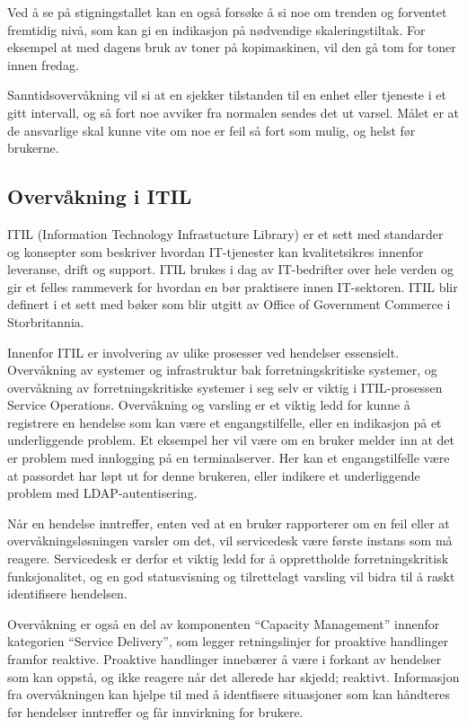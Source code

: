 Ved å se på stigningstallet kan en også forsøke å si noe om trenden og forventet fremtidig nivå, som kan gi en indikasjon på nødvendige skaleringstiltak. For eksempel at med dagens bruk av toner på kopimaskinen, vil den gå tom for toner innen fredag. 

Sanntidsovervåkning vil si at en sjekker tilstanden til en enhet eller tjeneste i et gitt intervall, og så fort noe avviker fra normalen sendes det ut varsel. Målet er at de ansvarlige skal kunne vite om noe er feil så fort som mulig, og helst før brukerne.

\clearpage
\subsection{Overvåkning i ITIL}
ITIL (Information Technology Infrastucture Library) er et sett med standarder og konsepter som beskriver hvordan IT-tjenester kan kvalitetsikres innenfor leveranse, drift og support. ITIL brukes i dag av IT-bedrifter over hele verden og gir et felles rammeverk for hvordan en bør praktisere innen IT-sektoren. ITIL blir definert i et sett med bøker som blir utgitt av Office of Government Commerce i Storbritannia.

Innenfor ITIL er involvering av ulike prosesser ved hendelser essensielt. Overvåkning av systemer og infrastruktur bak forretningskritiske systemer, og overvåkning av forretningskritiske systemer i seg selv er viktig i ITIL-prosessen Service Operations. Overvåkning og varsling er et viktig ledd for kunne å registrere en hendelse som kan være et engangstilfelle, eller en indikasjon på et underliggende problem. Et eksempel her vil være om en bruker melder inn at det er problem med innlogging på en terminalserver. Her kan et engangstilfelle være at passordet har løpt ut for denne brukeren, eller indikere et underliggende problem med LDAP-autentisering.

Når en hendelse inntreffer, enten ved at en bruker rapporterer om en feil eller at overvåkningsløsningen varsler om det, vil servicedesk være første instans som må reagere. Servicedesk er derfor et viktig ledd for å opprettholde forretningskritisk funksjonalitet, og en god statusvisning og tilrettelagt varsling vil bidra til å raskt identifisere hendelsen.

Overvåkning er også en del av komponenten ``Capacity Management'' innenfor kategorien ``Service Delivery'', som legger retningslinjer for proaktive handlinger framfor reaktive. Proaktive handlinger innebærer å være i forkant av hendelser som kan oppstå, og ikke reagere når det allerede har skjedd; reaktivt. Informasjon fra overvåkningen kan hjelpe til med å identfisere situasjoner som kan håndteres før hendelser inntreffer og får innvirkning for brukere. \cite{itil1,itil2,events}

